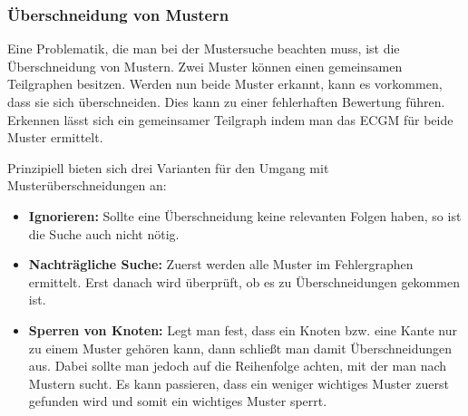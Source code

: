 \subsubsection{Überschneidung von Mustern}
Eine Problematik, die man bei der Mustersuche beachten muss, ist die 
Überschneidung von Mustern. Zwei Muster können einen gemeinsamen 
Teilgraphen besitzen. Werden nun beide Muster erkannt, kann es 
vorkommen, dass sie sich überschneiden. Dies kann zu einer fehlerhaften 
Bewertung führen. Erkennen lässt sich ein gemeinsamer Teilgraph indem 
man das ECGM für beide Muster ermittelt.

Prinzipiell bieten sich drei Varianten für den Umgang mit Musterüberschneidungen an:
\begin{itemize}

	\item \textbf{Ignorieren:} Sollte eine Überschneidung keine relevanten 
	      Folgen haben, so ist die Suche auch nicht nötig.
	      
	\item \textbf{Nachträgliche Suche:} Zuerst werden alle Muster im Fehlergraphen 
	      ermittelt. Erst danach wird überprüft, ob es zu Überschneidungen gekommen 
	      ist.

	\item \textbf{Sperren von Knoten:} Legt man fest, dass ein Knoten bzw. eine 
	      Kante nur zu einem Muster gehören kann, dann schließt man damit 
	      Überschneidungen aus. Dabei sollte man jedoch auf die Reihenfolge 
	      achten, mit der man nach Mustern sucht. Es kann passieren, dass ein 
	      weniger wichtiges Muster zuerst gefunden wird und somit ein wichtiges Muster 
	      sperrt.
\end{itemize}

